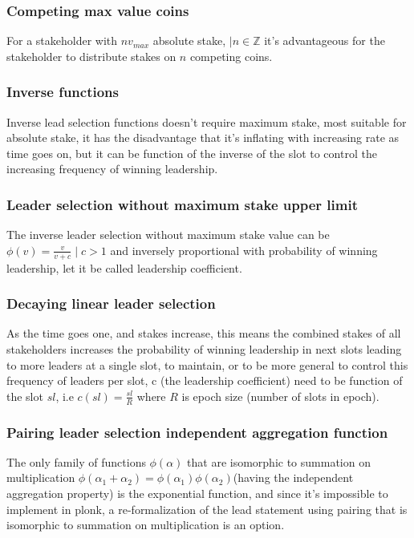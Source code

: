\documentclass{article}
\begin{document}
\subsubsection{ Competing max value coins}

For a stakeholder with $nv_{max}$ absolute stake, $\mid n \in \mathbb{Z}$
it's advantageous for the stakeholder to distribute stakes on $n$
competing coins.

\subsubsection{ Inverse functions}

Inverse lead selection functions doesn't require maximum stake, most
suitable for absolute stake, it has the disadvantage that it's inflating
with increasing rate as time goes on, but it can be function of the
inverse of the slot to control the increasing frequency of winning
leadership.

\subsubsection{ Leader selection without maximum stake upper limit}

The inverse leader selection without maximum stake value can be
$\phi(v)=\frac{v}{v+c} \mid c  > 1$ and inversely proportional
with probability of winning leadership, let it be called leadership
coefficient.


\subsubsection{ Decaying linear leader selection}

As the time goes one, and stakes increase, this means the combined stakes
of all stakeholders increases the probability of winning leadership
in next slots leading to more leaders at a single slot, to maintain,
or to be more general to control this frequency of leaders per slot, c
(the leadership coefficient) need to be function of the slot $sl$, i.e
$c(sl) = \frac{sl}{R}$ where $R$ is epoch size (number of slots in epoch).

\subsubsection{ Pairing leader selection independent aggregation function}

The only family of functions $\phi(\alpha)$ that are isomorphic
to summation on multiplication $\phi(\alpha_1+\alpha_2)
= \phi(\alpha_1)\phi(\alpha_2)$(having the independent aggregation
property) is the exponential function, and since it's impossible to
implement in plonk,  a re-formalization of the lead statement using
pairing that is isomorphic to summation on multiplication is an option.
\end{document}
